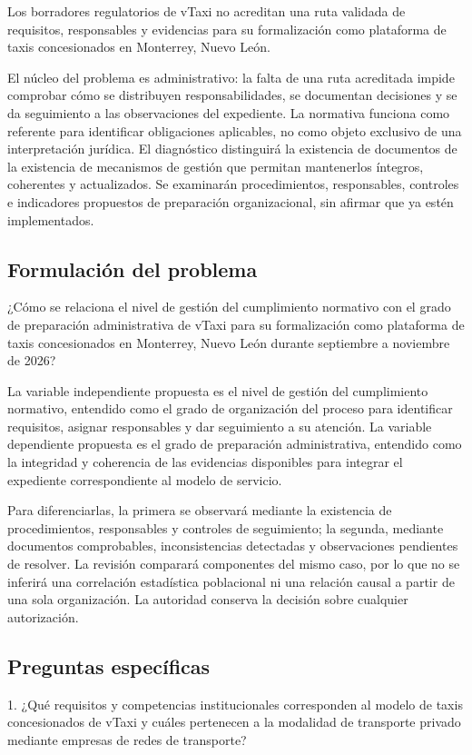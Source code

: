 {Los borradores regulatorios de vTaxi no acreditan una ruta validada de requisitos, responsables y evidencias para su formalización como plataforma de taxis concesionados en Monterrey, Nuevo León.


El núcleo del problema es administrativo: la falta de una ruta acreditada impide comprobar cómo se distribuyen responsabilidades, se documentan decisiones y se da seguimiento a las observaciones del expediente. La normativa funciona como referente para identificar obligaciones aplicables, no como objeto exclusivo de una interpretación jurídica. El diagnóstico distinguirá la existencia de documentos de la existencia de mecanismos de gestión que permitan mantenerlos íntegros, coherentes y actualizados. Se examinarán procedimientos, responsables, controles e indicadores propuestos de preparación organizacional, sin afirmar que ya estén implementados.


\subsection{Formulación del problema}
¿Cómo se relaciona el nivel de gestión del cumplimiento normativo con el grado de preparación administrativa de vTaxi para su formalización como plataforma de taxis concesionados en Monterrey, Nuevo León durante septiembre a noviembre de 2026?


La variable independiente propuesta es el nivel de gestión del cumplimiento normativo, entendido como el grado de organización del proceso para identificar requisitos, asignar responsables y dar seguimiento a su atención. La variable dependiente propuesta es el grado de preparación administrativa, entendido como la integridad y coherencia de las evidencias disponibles para integrar el expediente correspondiente al modelo de servicio.


Para diferenciarlas, la primera se observará mediante la existencia de procedimientos, responsables y controles de seguimiento; la segunda, mediante documentos comprobables, inconsistencias detectadas y observaciones pendientes de resolver. La revisión comparará componentes del mismo caso, por lo que no se inferirá una correlación estadística poblacional ni una relación causal a partir de una sola organización. La autoridad conserva la decisión sobre cualquier autorización.


\subsection{Preguntas específicas}
1. ¿Qué requisitos y competencias institucionales corresponden al modelo de taxis concesionados de vTaxi y cuáles pertenecen a la modalidad de transporte privado mediante empresas de redes de transporte?


}
